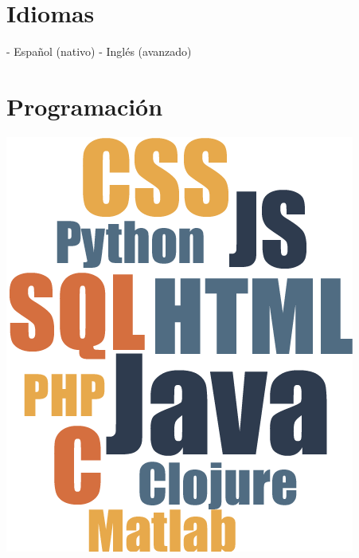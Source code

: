 \documentclass[]{friggeri-cv}
\begin{document}
\begin{aside}
  \section{Idiomas}
    - Español (nativo)
    - Inglés (avanzado)
    ~       
  \section{Programación}
    \includegraphics[scale=0.9]{img/cloud.png}
    ~    
\end{aside}
~
\\ [0.8cm]
\end{document}
